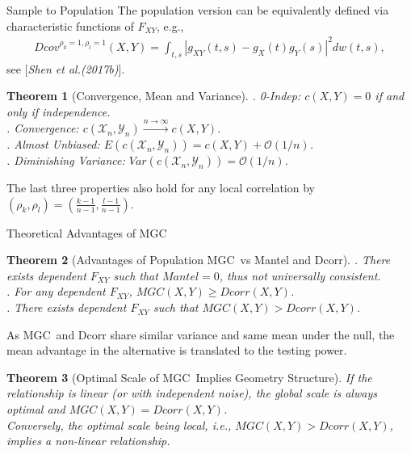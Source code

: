 \documentclass[mathserif,t]{beamer}
\newtheorem{thm}{Theorem}
\newcommand{\Mgc}{MGC}
\newcommand{\mbx}{X}
\newcommand{\mby}{Y}
\begin{document}
\begin{frame}{Sample to Population}
\pause
The population version can be equivalently defined via characteristic functions of $F_{XY}$, e.g.,
\pause 
\begin{align*}
Dcov^{\rho_{k}=1, \rho_{l}=1}(\mbx,\mby) = \int_{t,s} |g_{XY}(t,s)-g_{X}(t)g_{Y}(s)|^2 dw(t,s),
\end{align*}
see [\textit{Shen et al.(2017b)}]\cite{ShenEtAl2018}.\\

\pause
\begin{thm}[Convergence, Mean and Variance]
. 0-Indep: $c(X,Y) =0$ if and only if independence.\\
\pause
{}. Convergence: $c(\mathcal{X}_{n},\mathcal{Y}_{n}) \stackrel{n \rightarrow \infty}{\rightarrow} c(X,Y)$.\\
\pause
{}. Almost Unbiased: $E(c(\mathcal{X}_{n},\mathcal{Y}_{n})) =c(X,Y)+\mathcal{O}(1/n)$.\\
\pause
{}. Diminishing Variance: $Var(c(\mathcal{X}_{n},\mathcal{Y}_{n})) =\mathcal{O}(1/n)$.\\
\end{thm}
\pause
\medskip
The last three properties also hold for any local correlation by $(\rho_{k},\rho_{l})=(\frac{k-1}{n-1},\frac{l-1}{n-1})$.
\end{frame}

\begin{frame}{Theoretical Advantages of \Mgc}
\begin{thm}[Advantages of Population \Mgc~vs Mantel and Dcorr]
. There exists dependent $F_{XY}$ such that $Mantel=0$, thus not universally consistent.\\
\pause
{}. For any dependent $F_{XY}$, $MGC(X,Y) \geq Dcorr(X,Y)$. \\
\pause
{}. There exists dependent $F_{XY}$ such that $MGC(X,Y)>Dcorr(X,Y)$.\\
\end{thm}
\pause
As \Mgc~and Dcorr share similar variance and same mean under the null, the mean advantage in the alternative is translated to the testing power. 
\pause
\begin{thm}[Optimal Scale of \Mgc~Implies Geometry Structure]
\pause
If the relationship is linear (or with independent noise), the global scale is always optimal and $MGC(X,Y)=Dcorr(X,Y)$.\\
\pause
\medskip
Conversely, the optimal scale being local, i.e., $MGC(X,Y)>Dcorr(X,Y)$, implies a non-linear relationship.
\end{thm}
\end{frame}
\end{document}
